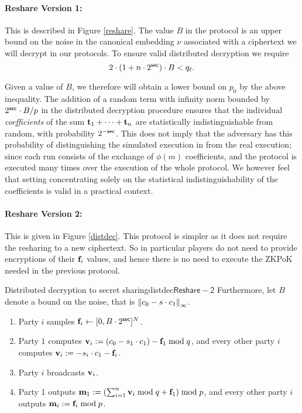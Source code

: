 \paragraph{Reshare Version 1:}
This is described in Figure \ref{reshare}.
The value $B$ in the protocol is an upper bound on the noise in the canonical embedding
$\nu$ associated with a ciphertext we will decrypt in our protocols.
To ensure valid distributed decryption we require
\[ 2 \cdot (1+n \cdot 2^{\mathsf{sec}}) \cdot B < q_{\ell}. \]

Given a value of $B$, we therefore will obtain a lower bound
on $p_0$ by the above inequality.
The addition of a random term with infinity norm bounded by
$2^{\mathsf{sec}} \cdot B/p$ in the distributed decryption procedure
ensures that the individual {\em coefficients} of the sum
$\mathbf{t}_1+\cdots+\mathbf{t}_n$ are statistically indistinguishable from
random, with probability $2^{-\mathsf{sec}}$.
This does not imply that the adversary has this probability of
distinguishing the simulated execution in \cite{SPDZ} from the
real execution; since each run consists of the exchange of 
$\phi(m)$ coefficients, and the protocol is executed many times
over the execution of the whole protocol.
We however feel that setting concentrating solely on the
statistical indistinguishability of the coefficients is valid 
in a practical context.

\paragraph{Reshare Version 2:}
This is given in Figure \ref{distdec}.
This protocol is simpler as it does not require the resharing to a 
new ciphertext.
So in particular players do not need to provide encryptions of
their $\mathbf{f}_i$ values, and hence there is no need
to execute the ZKPoK needed in the previous protocol.

\begin{Boxfig}{Distributed decryption to secret
    sharing}{distdec}{$\mathsf{Reshare-2}$}
Furthermore, let $B$ denote a bound on the noise, that is ${\Vert c_0 - s \cdot c_1 \Vert}_\infty$.
\begin{enumerate}
\item Party $i$ samples $\mathbf{f}_i \leftarrow [0,B\cdot 2^{\mathsf{sec}}]^N$.
\item Party $1$ computes
  $\mathbf{v}_i := (c_0 - s_1 \cdot c_1) - \mathbf{f}_1 \bmod q$, and every other
  party $i$ computes $\mathbf{v}_i :=  -s_i \cdot c_1- \mathbf{f}_i$.
\item Party $i$ broadcasts $\mathbf{v}_i$.
\item Party 1 outputs
  $\mathbf{m}_1 := (\sum_{i=1}^n \mathbf{v}_i \bmod q + \mathbf{f}_1) \bmod p$, and
  every other party $i$ outputs $\mathbf{m}_i := \mathbf{f}_i \bmod p$.
\end{enumerate}
\end{Boxfig}





